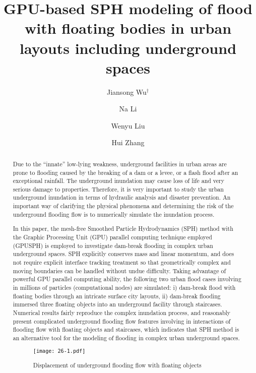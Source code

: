 \documentclass[10pt]{article}
\title{GPU-based SPH modeling of flood with floating bodies in urban layouts including underground spaces}
\date{}
\author[1]{Jiansong Wu$^\dagger$}
\author[1]{Na Li}
\author[1]{Wenyu Liu}
\author[2]{Hui Zhang}
\affil[1]{School of Resources and Safety Engineering, China University of Mining \& Technology, Beijing 100083, China}
\affil[2]{Institute for Public Safety Research, Tsinghua University, Beijing 10083, China}
\affil[$\relax$]{\email{\dagger}{jiansongwu@hotmail.com}}
\begin{document}
\maketitle


\begin{abstract}
Due to the ``innate'' low-lying weakness, underground facilities in urban areas are prone to flooding caused by the breaking of a dam or a levee, or a flash flood after an exceptional rainfall. The underground inundation may cause loss of life and very serious damage to properties. Therefore, it is very important to study the urban underground inundation in terms of hydraulic analysis and disaster prevention. An important way of clarifying the physical phenomena and determining the risk of the underground flooding flow is to numerically simulate the inundation process.

In this paper, the mesh-free Smoothed Particle Hydrodynamics (SPH) method with the Graphic Processing Unit (GPU) parallel computing technique employed (GPUSPH) is employed to investigate dam-break flooding in complex urban underground spaces. SPH explicitly conserves mass and linear momentum, and does not require explicit interface tracking treatment so that geometrically complex and moving boundaries can be handled without undue difficulty. Taking advantage of powerful GPU parallel computing ability, the following two urban flood cases involving in millions of particles (computational nodes) are simulated: i) dam-break flood with floating bodies through an intricate surface city layouts, ii) dam-break flooding immersed three floating objects into an underground facility through staircases. Numerical results fairly reproduce the complex inundation process, and reasonably present complicated underground flooding flow features involving in interactions of flooding flow with floating objects and staircases, which indicates that SPH method is an alternative tool for the modeling of flooding in complex urban underground spaces.

\begin{figure}[!htb]
\centering
\texttt{[image: 26-1.pdf]}
\caption{Displacement of underground flooding flow with floating objects}\label{fig:26}
\end{figure}

\end{abstract}



\addbib
\end{document}

